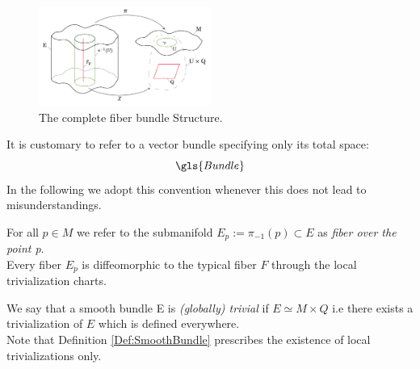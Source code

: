 \documentclass[Main]{subfiles}
\begin{document}
			\begin{figure}[h!]
  				\caption{The complete fiber bundle Structure.}
  				\includegraphics[width=0.5\textwidth]{Pictures/fiberbundle}				
  				\centering
			\end{figure}
				It is customary to refer to a vector bundle specifying only its total space:
				\begin{displaymath}
					\gls{Bundle}%
				\end{displaymath}
			 	In the following we adopt this convention whenever this does not lead to misunderstandings.
			
				For all $p\in M$ we refer to the submanifold $E_{p} := \pi_{-1}(p) \subset E $ as \emph{fiber over the point p}.
				\\
				Every fiber $E_p$ is diffeomorphic to the typical fiber $F$ through the local trivialization charts.
			
			\begin{notationfix}
				We say that a smooth bundle E is \emph{(globally) trivial} if $E \simeq M \times Q$ i.e there exists a trivialization of $E$ which is defined everywhere.
				\\
				Note that Definition \ref{Def:SmoothBundle}  prescribes the existence of local trivializations only.
			\end{notationfix}
			
\end{document}
